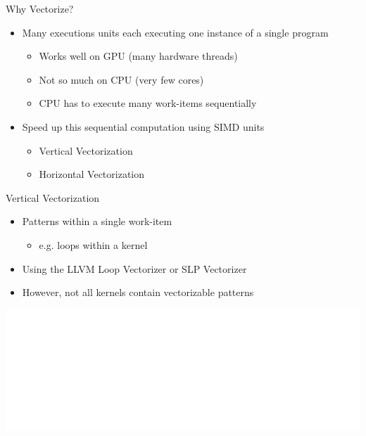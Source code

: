 
\begin{frame}{Why Vectorize?}

\begin{itemize}
    \item Many executions units each executing one instance of a single program 
    \begin{itemize}
        \item Works well on GPU (many hardware threads)
        \item Not so much on CPU (very few cores)
        \item CPU has to execute many work-items sequentially
    \end{itemize}
    \item Speed up this sequential computation using SIMD units
    \begin{itemize}
        \item Vertical Vectorization
        \item Horizontal Vectorization
    \end{itemize}
\end{itemize}

\end{frame}


\begin{frame}{Vertical Vectorization}

\begin{itemize}
    \item Patterns within a single work-item
    \begin{itemize}
        \item e.g. loops within a kernel
    \end{itemize}
    \item Using the LLVM Loop Vectorizer or SLP Vectorizer
    \item However, not all kernels contain vectorizable patterns
\end{itemize}

\vspace{5ex}
\hspace{1em}\includegraphics[scale=0.40]{images/vertical-vectorization.pdf}

\end{frame}

